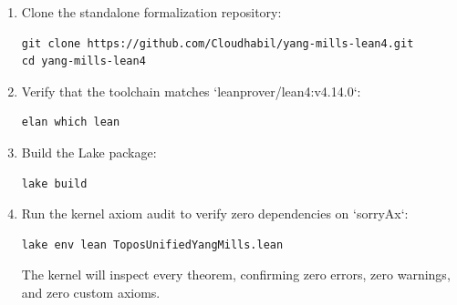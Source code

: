 \documentclass[11pt,reqno]{amsart}
\theoremstyle{plain}
\theoremstyle{definition}
\theoremstyle{remark}
\numberwithin{equation}{section}
\begin{document}
\begin{enumerate}
\item Clone the standalone formalization repository:
\begin{verbatim}
git clone https://github.com/Cloudhabil/yang-mills-lean4.git
cd yang-mills-lean4
\end{verbatim}

\item Verify that the toolchain matches `leanprover/lean4:v4.14.0`:
\begin{verbatim}
elan which lean
\end{verbatim}

\item Build the Lake package:
\begin{verbatim}
lake build
\end{verbatim}

\item Run the kernel axiom audit to verify zero dependencies on `sorryAx`:
\begin{verbatim}
lake env lean ToposUnifiedYangMills.lean
\end{verbatim}
The kernel will inspect every theorem, confirming zero errors, zero warnings, and zero custom axioms.
\end{enumerate}
\end{document}
